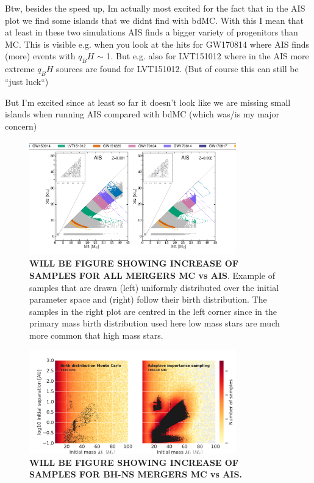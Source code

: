 \documentclass[a4paper,fleqn,usenatbib]{mnras}
\newcommand{\floor}[1]{\textbf{\textcolor{ochre}{#1}}}
\begin{document}
Btw, besides the speed up, Im actually most excited for the fact that in the AIS plot we find some islands  that we didnt find with bdMC. With this I mean that at least in these two simulations AIS finds a bigger variety of progenitors than MC. This is visible e.g. when you look at the hits for GW170814 where AIS finds (more) events with $q_BH$ $\sim$ 1. But e.g. also for LVT151012 where in the AIS more extreme $q_BH$ sources are found for LVT151012. (But of course this can still be ``just luck``)

But I'm excited since at least so far it doesn't look like we are missing small islands when running AIS compared with bdMC (which was/is my major concern)


\begin{figure}
	\includegraphics[width=0.8\textwidth]{images/M1M2DCOsAIS.png}
    \caption{ \floor{WILL BE FIGURE SHOWING INCREASE OF SAMPLES FOR ALL MERGERS MC vs AIS}. Example of   samples that are drawn (left)  uniformly distributed over the initial parameter space and (right) follow their birth distribution. The samples in the right plot are centred in the left corner since in the primary mass birth distribution used here low mass stars are much more common that high mass stars. }
    \label{fig:Progenitors_ALL}
\end{figure}
\begin{figure}
	\includegraphics[width=0.8\textwidth]{images/BHNScomparisonM1ZAMSseparationInitialFixedCPUtime.png}
    \caption{\floor{WILL BE FIGURE SHOWING INCREASE OF SAMPLES FOR BH-NS MERGERS MC vs AIS. }}
    \label{fig:Progenitors_BHNS}
\end{figure}
\end{document}
